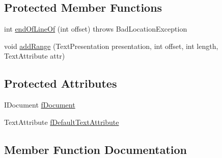 \subsection*{Protected Member Functions}
\begin{DoxyCompactItemize}
\item 
int \hyperlink{classcom_1_1chaintronics_1_1the78mole_1_1reqtool_1_1editors_1_1NonRuleBasedDamagerRepairer_ad64ebcce95bd22599ff2bcc34f7cee51}{end\+Of\+Line\+Of} (int offset)  throws Bad\+Location\+Exception 
\item 
void \hyperlink{classcom_1_1chaintronics_1_1the78mole_1_1reqtool_1_1editors_1_1NonRuleBasedDamagerRepairer_a415c83ab6ed22f7209097cce40fceffd}{add\+Range} (Text\+Presentation presentation, int offset, int length, Text\+Attribute attr)
\end{DoxyCompactItemize}
\subsection*{Protected Attributes}
\begin{DoxyCompactItemize}
\item 
I\+Document \hyperlink{classcom_1_1chaintronics_1_1the78mole_1_1reqtool_1_1editors_1_1NonRuleBasedDamagerRepairer_a6458e8b12d8a20efbd78d3a67dbbdd69}{f\+Document}
\item 
Text\+Attribute \hyperlink{classcom_1_1chaintronics_1_1the78mole_1_1reqtool_1_1editors_1_1NonRuleBasedDamagerRepairer_aaf7d93ad1383ad55542fe63398191204}{f\+Default\+Text\+Attribute}
\end{DoxyCompactItemize}


\subsection{Member Function Documentation}
